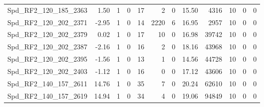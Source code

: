 \begin{longtable}[c]{@{}lrrrrrrrrrrr@{}}
Spd\_RF2\_120\_185\_2363     & 1.50                   & 1                       & 0                       & 17                     & 2                       & 0                       & 15.50                   & 4316                     & 10                       & 0                        & 0                        \\
Spd\_RF2\_120\_202\_2371     & -2.95                  & 1                       & 0                       & 14                     & 2220                    & 6                       & 16.95                   & 2957                     & 10                       & 0                        & 0                        \\
Spd\_RF2\_120\_202\_2379     & 0.02                   & 1                       & 0                       & 17                     & 10                      & 0                       & 16.98                   & 39742                    & 10                       & 0                        & 0                        \\
Spd\_RF2\_120\_202\_2387     & -2.16                  & 1                       & 0                       & 16                     & 2                       & 0                       & 18.16                   & 43968                    & 10                       & 0                        & 0                        \\
Spd\_RF2\_120\_202\_2395     & -1.56                  & 1                       & 0                       & 13                     & 1                       & 0                       & 14.56                   & 44728                    & 10                       & 0                        & 0                        \\
Spd\_RF2\_120\_202\_2403     & -1.12                  & 1                       & 0                       & 16                     & 0                       & 0                       & 17.12                   & 43606                    & 10                       & 0                        & 0                        \\
Spd\_RF2\_140\_157\_2611     & 14.76                  & 1                       & 0                       & 35                     & 7                       & 0                       & 20.24                   & 62610                    & 10                       & 0                        & 0                        \\
Spd\_RF2\_140\_157\_2619     & 14.94                  & 1                       & 0                       & 34                     & 4                       & 0                       & 19.06                   & 94849                    & 10                       & 0                        & 0                        \\

\end{longtable}
